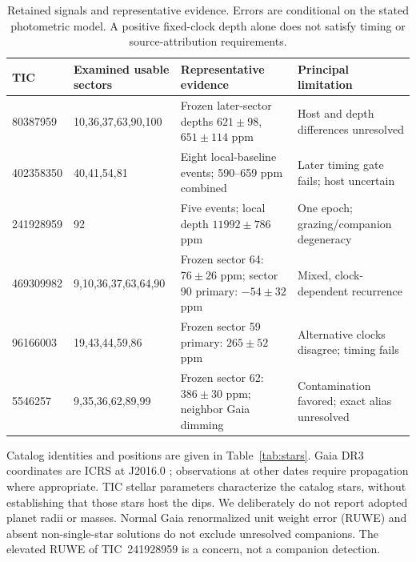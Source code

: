 \documentclass[11pt]{article}
\begin{document}
\begin{table}[htbp]
\centering\small
\caption{Retained signals and representative evidence. Errors are conditional on the stated photometric model. A positive fixed-clock depth alone does not satisfy timing or source-attribution requirements.}\label{tab:inventory}
\begin{tabularx}{\textwidth}{@{}l l X X@{}}
\toprule
TIC & Examined usable sectors & Representative evidence & Principal limitation\\
\midrule
80387959 & 10,36,37,63,90,100 & Frozen later-sector depths $621\pm98$, $651\pm114$ ppm & Host and depth differences unresolved\\
402358350 & 40,41,54,81 & Eight local-baseline events; 590--659 ppm combined & Later timing gate fails; host uncertain\\
241928959 & 92 & Five events; local depth $11992\pm786$ ppm & One epoch; grazing/companion degeneracy\\
469309982 & 9,10,36,37,63,64,90 & Frozen sector 64: $76\pm26$ ppm; sector 90 primary: $-54\pm32$ ppm & Mixed, clock-dependent recurrence\\
96166003 & 19,43,44,59,86 & Frozen sector 59 primary: $265\pm52$ ppm & Alternative clocks disagree; timing fails\\
5546257 & 9,35,36,62,89,99 & Frozen sector 62: $386\pm30$ ppm; neighbor Gaia dimming & Contamination favored; exact alias unresolved\\
\bottomrule
\end{tabularx}
\end{table}

Catalog identities and positions are given in Table~\ref{tab:stars}. Gaia DR3 coordinates are ICRS at J2016.0 \citep{gaia2023}; observations at other dates require propagation where appropriate. TIC stellar parameters \citep{tic2019} characterize the catalog stars, without establishing that those stars host the dips. We deliberately do not report adopted planet radii or masses. Normal Gaia renormalized unit weight error (RUWE) and absent non-single-star solutions do not exclude unresolved companions. The elevated RUWE of TIC~241928959 is a concern, not a companion detection.
\end{document}

